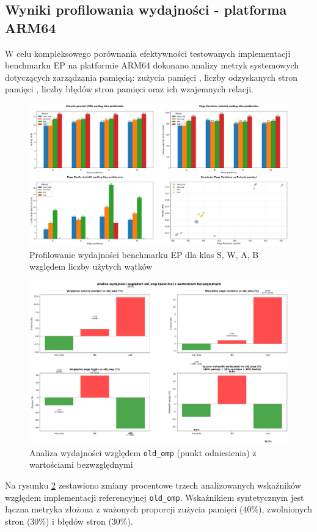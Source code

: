 \subsection{Wyniki profilowania wydajności - platforma ARM64}
W celu kompleksowego porównania efektywności testowanych implementacji benchmarku EP na platformie ARM64 dokonano analizy metryk systemowych dotyczących zarządzania pamięcią: zużycia pamięci , liczby odzyskanych stron pamięci , liczby błędów stron pamięci  oraz ich wzajemnych relacji.
\begin{figure}[H]
    \centering
    \includegraphics[width=\textwidth]{analiza/images/parallel/ep/arm/chart_01_memory_comparison.png}
    \caption{Profilowanie wydajności benchmarku EP dla klas S, W, A, B względem liczby użytych wątków}
    \label{ep_porownanie_zuzycia_pamieci}
\end{figure}
 


\begin{figure}[H]
    \centering
    \includegraphics[width=\textwidth]{analiza/images/parallel/ep/arm/chart_05_performance_ratios.png}
    \caption{Analiza wydajności względem \texttt{old\_omp} (punkt odniesienia) z wartościami bezwzględnymi}
    \label{ep_analiza_wzgledem_old_omp}
\end{figure}
Na rysunku \ref{ep_analiza_wzgledem_old_omp} zestawiono zmiany procentowe trzech analizowanych wskaźników względem implementacji referencyjnej \texttt{old\_omp}. Wskaźnikiem syntetycznym jest łączna metryka złożona z ważonych proporcji zużycia pamięci (40\%), zwolnionych stron (30\%) i błędów stron (30\%).



